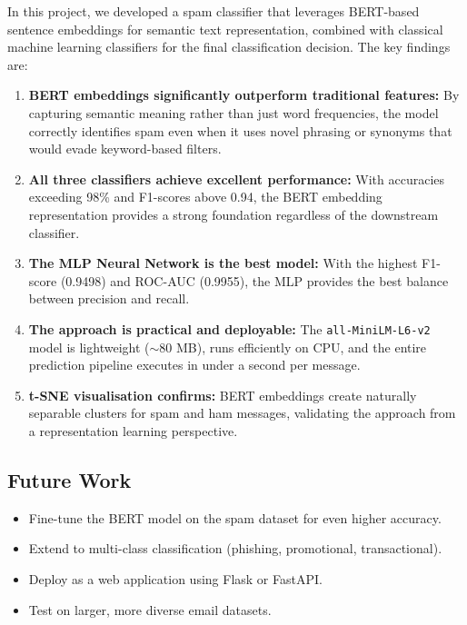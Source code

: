 \documentclass[12pt,a4paper]{article}
\begin{document}
In this project, we developed a spam classifier that leverages BERT-based sentence embeddings for semantic text representation, combined with classical machine learning classifiers for the final classification decision. The key findings are:

\begin{enumerate}
    \item \textbf{BERT embeddings significantly outperform traditional features:} By capturing semantic meaning rather than just word frequencies, the model correctly identifies spam even when it uses novel phrasing or synonyms that would evade keyword-based filters.

    \item \textbf{All three classifiers achieve excellent performance:} With accuracies exceeding 98\% and F1-scores above 0.94, the BERT embedding representation provides a strong foundation regardless of the downstream classifier.

    \item \textbf{The MLP Neural Network is the best model:} With the highest F1-score (0.9498) and ROC-AUC (0.9955), the MLP provides the best balance between precision and recall.

    \item \textbf{The approach is practical and deployable:} The \texttt{all-MiniLM-L6-v2} model is lightweight ($\sim$80 MB), runs efficiently on CPU, and the entire prediction pipeline executes in under a second per message.

    \item \textbf{t-SNE visualisation confirms:} BERT embeddings create naturally separable clusters for spam and ham messages, validating the approach from a representation learning perspective.
\end{enumerate}

\subsection{Future Work}
\begin{itemize}
    \item Fine-tune the BERT model on the spam dataset for even higher accuracy.
    \item Extend to multi-class classification (phishing, promotional, transactional).
    \item Deploy as a web application using Flask or FastAPI.
    \item Test on larger, more diverse email datasets.
\end{itemize}
\end{document}
